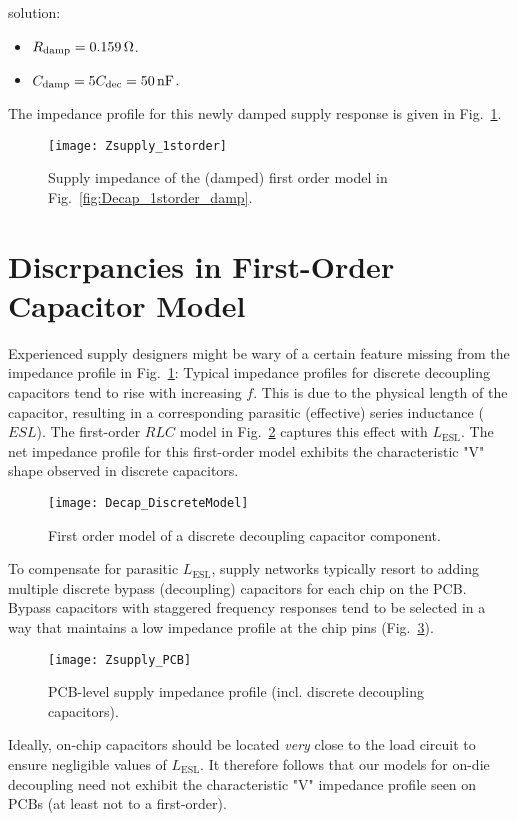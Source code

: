 solution:
\begin{itemize}[noitemsep]
\item $R_\mathrm{damp}=0.159\mathrm{\,\Omega}$.
\item $C_\mathrm{damp}=5 C_\mathrm{dec}=50\mathrm{\,nF}$.
\end{itemize}
%
\par\noindent The impedance profile for this newly damped supply response is
given in Fig.~\ref{fig:Zsupply_1storder}.
\begin{figure}[!ht]
	\centering
	\texttt{[image: Zsupply\_1storder]}
	\caption{Supply impedance of the (damped) first order model in Fig.~\ref{fig:Decap_1storder_damp}.}
\label{fig:Zsupply_1storder}%
\end{figure}
%
\section{Discrpancies in First-Order Capacitor Model}
\par Experienced supply designers might be wary of a certain feature missing from the
impedance profile in Fig.~\ref{fig:Zsupply_1storder}: Typical impedance
profiles for discrete decoupling capacitors tend to rise with increasing $f$.
This is due to the physical length of the capacitor, resulting in a
corresponding parasitic (effective) series inductance ($ESL$).  The first-order
$RLC$ model in Fig.~\ref{fig:Decap_DiscreteModel} captures this effect
with $L_\mathrm{ESL}$. The net impedance profile for this first-order model
exhibits the characteristic "V" shape observed in discrete capacitors.
%
\begin{figure}[!ht]
	\centering
	\texttt{[image: Decap\_DiscreteModel]}
	\caption{First order model of a discrete decoupling capacitor component.}
\label{fig:Decap_DiscreteModel}%
\end{figure}
%
\par To compensate for parasitic $L_\mathrm{ESL}$, supply networks typically
resort to adding multiple discrete bypass (decoupling) capacitors for each chip
on the PCB. Bypass capacitors with staggered frequency responses tend to be
selected in a way that maintains a low impedance profile at the chip pins
(Fig.~\ref{fig:Zsupply_PCB}).
%
\begin{figure}[!ht]
	\centering
	\texttt{[image: Zsupply\_PCB]}
	\caption{PCB-level supply impedance profile (incl. discrete decoupling capacitors).}
\label{fig:Zsupply_PCB}%
\end{figure}
%
\par Ideally, on-chip capacitors should be located \emph{very} close to the
load circuit to ensure negligible values of $L_\mathrm{ESL}$. It
therefore follows that our models for on-die decoupling need not exhibit
the characteristic "V" impedance profile seen on PCBs (at least not to a
first-order).
%
